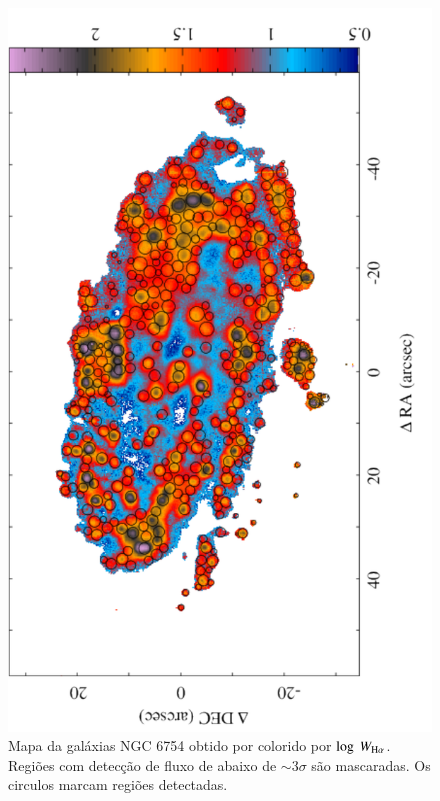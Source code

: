 \begin{figure}
 \includegraphics[scale=0.45,angle=-90]{figuras/map_EW_Ha_HII.pdf}
 \caption[MUSE: Mapa de $W_{{\rm H}\alpha}$ da galáxia NGC 6754]
 {Mapa da galáxias NGC 6754 obtido por \citet{Sanchez.etal.2015MUSE} colorido por $\log\ W_{\Ha}$. Regiões com detecção de fluxo de \Ha abaixo de $\sim 3\sigma$ são mascaradas. Os circulos marcam regiões \hii detectadas.}
 \label{fig:WHaSebasMUSE}
\end{figure}



